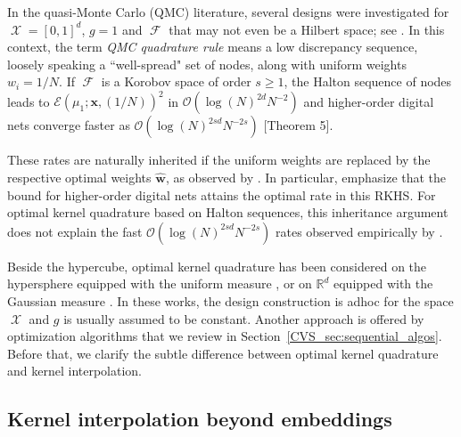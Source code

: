 \documentclass[twoside,11pt]{book}
\numberwithin{theorem}{chapter}
\numberwithin{definition}{chapter}
\numberwithin{proposition}{chapter}
\numberwithin{corollary}{chapter}
\numberwithin{example}{chapter}
\numberwithin{lemma}{chapter}
\numberwithin{assumption}{chapter}
\DeclareMathOperator{\F}{\mathcal{F}}
\DeclareMathOperator{\X}{\mathcal{X}}
\begin{document}
In the quasi-Monte Carlo (QMC) literature, several designs were investigated for $\X = [0,1]^{d}$, $g = 1$ and $\F$ that may not even be a Hilbert space; see \citep{DiPi10}. In this context, the term \emph{QMC quadrature rule} means a low discrepancy sequence, loosely speaking a ``well-spread" set of nodes, along with uniform weights $w_{i} = 1/N$. If $\F$ is a Korobov space of order $s \geq 1$, the Halton sequence of nodes \citep{Hal64} leads to $\mathcal{E}(\mu_1; \bm{x}, (1/N))^2$ in $\mathcal{O}(\log(N)^{2d} N^{-2})$ and higher-order digital nets converge faster as $\mathcal{O}(\log(N)^{2sd} N^{-2s})$ \citep{DiPi14}[Theorem 5].

These rates are naturally inherited if the uniform weights are replaced by the respective optimal weights $\hat{\bm{w}}$, as observed by \cite{BOGOS2019}. In particular, \cite{BOGOS2019} emphasize that the bound for higher-order digital nets attains the optimal rate in this RKHS.
For optimal kernel quadrature based on Halton sequences, this inheritance argument does not explain the fast $\mathcal{O}(\log(N)^{2sd} N^{-2s})$ rates observed empirically by \cite{Oett17}.

Beside the hypercube, optimal kernel quadrature has been considered on the hypersphere equipped with the uniform measure \citep{EhGrCh19}, or on $\mathbb{R}^{d}$ equipped with the Gaussian measure \citep{KaSa19}. In these works, the design construction is adhoc for the space $\X$ and
$g$ is usually assumed to be constant. Another approach is offered by optimization algorithms that we review in Section~\ref{CVS_sec:sequential_algos}. Before that, we clarify the subtle difference between optimal kernel quadrature and kernel interpolation.

\subsection{Kernel interpolation beyond embeddings}\label{CVS_sec:review_kernel_interpolation_beyond_mu}
\end{document}
